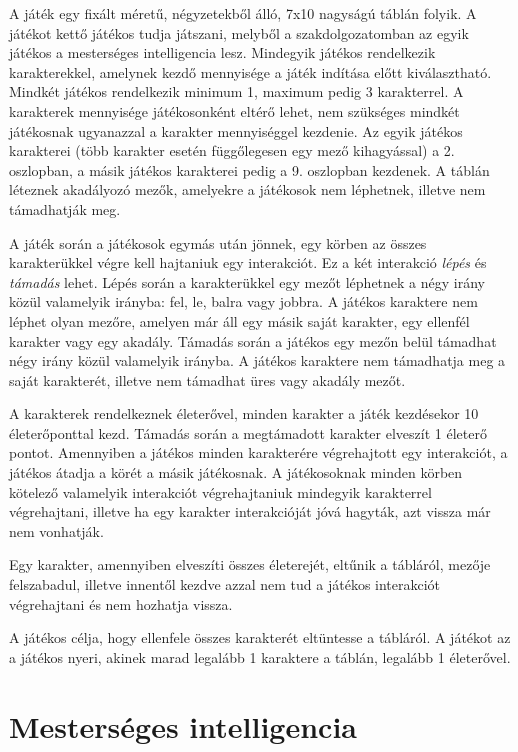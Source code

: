 \documentclass[
]{thesis-ekf}
\theoremstyle{definition}
\theoremstyle{remark}
\begin{document}
A játék egy fixált méretű, négyzetekből álló, 7x10 nagyságú táblán folyik. A játékot kettő játékos tudja játszani, melyből a szakdolgozatomban az egyik játékos a mesterséges intelligencia lesz. Mindegyik játékos rendelkezik karakterekkel, amelynek kezdő mennyisége a játék indítása előtt kiválasztható. Mindkét játékos rendelkezik minimum 1, maximum pedig 3 karakterrel. A karakterek mennyisége játékosonként eltérő lehet, nem szükséges mindkét játékosnak ugyanazzal a karakter mennyiséggel kezdenie. Az egyik játékos karakterei (több karakter esetén függőlegesen egy mező kihagyással) a 2. oszlopban, a másik játékos karakterei pedig a 9. oszlopban kezdenek. A táblán léteznek akadályozó mezők, amelyekre a játékosok nem léphetnek, illetve nem támadhatják meg. 

A játék során a játékosok egymás után jönnek, egy körben az összes karakterükkel végre kell hajtaniuk egy interakciót. Ez a két interakció \emph{lépés} és \emph{támadás} lehet. Lépés során a karakterükkel egy mezőt léphetnek a négy irány közül valamelyik irányba: fel, le, balra vagy jobbra. A játékos karaktere nem léphet olyan mezőre, amelyen már áll egy másik saját karakter, egy ellenfél karakter vagy egy akadály. Támadás során a játékos egy mezőn belül támadhat négy irány közül valamelyik irányba. A játékos karaktere nem támadhatja meg a saját karakterét, illetve nem támadhat üres vagy akadály mezőt.

A karakterek rendelkeznek életerővel, minden karakter a játék kezdésekor 10 életerőponttal kezd. Támadás során a megtámadott karakter elveszít 1 életerő pontot. Amennyiben a játékos minden karakterére végrehajtott egy interakciót, a játékos átadja a körét a másik játékosnak. A játékosoknak minden körben kötelező valamelyik interakciót végrehajtaniuk mindegyik karakterrel végrehajtani, illetve ha egy karakter interakcióját jóvá hagyták, azt vissza már nem vonhatják.

Egy karakter, amennyiben elveszíti összes életerejét, eltűnik a tábláról, mezője felszabadul, illetve innentől kezdve azzal nem tud a játékos interakciót végrehajtani és nem hozhatja vissza.
 
A játékos célja, hogy ellenfele összes karakterét eltüntesse a tábláról. A játékot az a játékos nyeri, akinek marad legalább 1 karaktere a táblán, legalább 1 életerővel.

\chapter{Mesterséges intelligencia}
\end{document}
